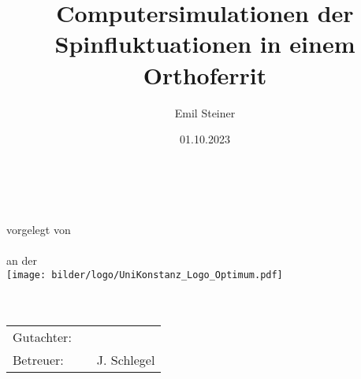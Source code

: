 

\usepackage{subfiles} %

\newcommand{\thesisTitle}{
	\begin{sffamily}
		\centering
		\Huge\textbf{\docTitle}\\
		\vspace{3em}
		\huge\textbf{\docThesisType}\\
		\centering vorgelegt von\\
		\vspace{1em}
		\Large\textbf{\docAuthor}\\
		\vspace{1em}
		an der\\
		\texttt{[image: bilder/logo/UniKonstanz\_Logo\_Optimum.pdf]}\\
		\Large\docUnisection\\
		\Large\docDepartment\\
		\vspace{2em}
		\centering\begin{tabular}{lll}%
			Gutachter: &  & \docSupervisorOne \\
			Betreuer:  &  & J. Schlegel       \\%
		\end{tabular}\\
	\end{sffamily}
}%

\date{01.10.2023}
\author{Emil Steiner}
\title{Computersimulationen der Spinfluktuationen in einem Orthoferrit}
\subtitle{}



\thesisTitle
\thispagestyle{empty}
\newpage

% 

\tableofcontents
\thispagestyle{empty}	%
\newpage
\setcounter{page}{1}	%

